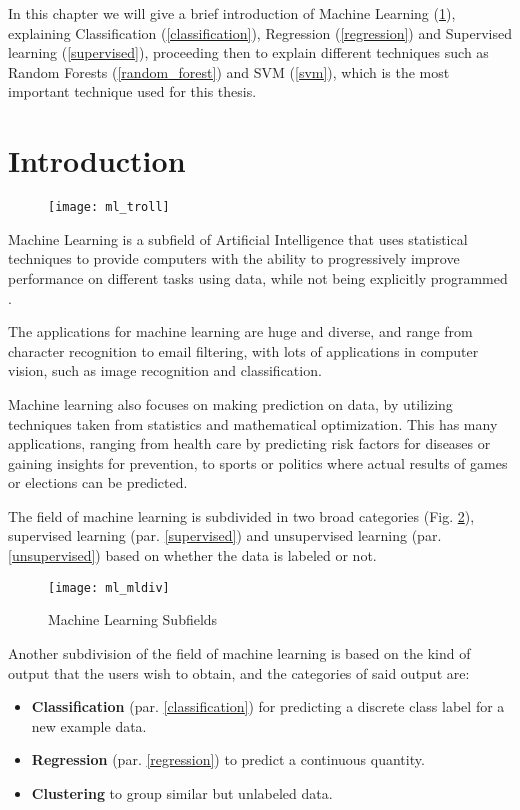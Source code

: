 In this chapter we will give a brief introduction of Machine Learning (\ref{ml}), explaining Classification (\ref{classification}), Regression (\ref{regression}) and Supervised learning (\ref{supervised}), proceeding then to explain different techniques such as Random Forests (\ref{random_forest}) and SVM (\ref{svm}), which is the most important technique used for this thesis.

\section{Introduction} \label{ml}

\begin{figure}[H]
	\centering
	\texttt{[image: ml\_troll]}
	\label{fig:ml_troll}
\end{figure}

Machine Learning is a subfield of Artificial Intelligence that uses statistical techniques to provide computers with the ability to progressively improve performance on different tasks using data, while not being explicitly programmed \cite{wiki:ml}.

The applications for machine learning are huge and diverse, and range from character recognition to email filtering, with lots of applications in computer vision, such as image recognition and classification.

Machine learning also focuses on making prediction on data, by utilizing techniques taken from statistics and mathematical optimization. This has many applications, ranging from health care by predicting risk factors for diseases or gaining insights for prevention, to sports or politics where actual results of games or elections can be predicted.

The field of machine learning is subdivided in two broad categories (Fig. \ref{fig:ml_mldiv}), supervised learning (par. \ref{supervised}) and unsupervised learning (par. \ref{unsupervised}) based on whether the data is labeled or not.

\begin{figure}[H]
	\centering
	\texttt{[image: ml\_mldiv]}
	\caption{Machine Learning Subfields \cite{ml_mldiv}}
	\label{fig:ml_mldiv}
\end{figure}

Another subdivision of the field of machine learning is based on the kind of output that the users wish to obtain, and the categories of said output are:
\begin{itemize}[noitemsep]
	\item \textbf{Classification} (par. \ref{classification}) for predicting a discrete class label for a new example data.
	\item \textbf{Regression} (par. \ref{regression}) to predict a continuous quantity.
	\item \textbf{Clustering} to group similar but unlabeled data.
\end{itemize}

